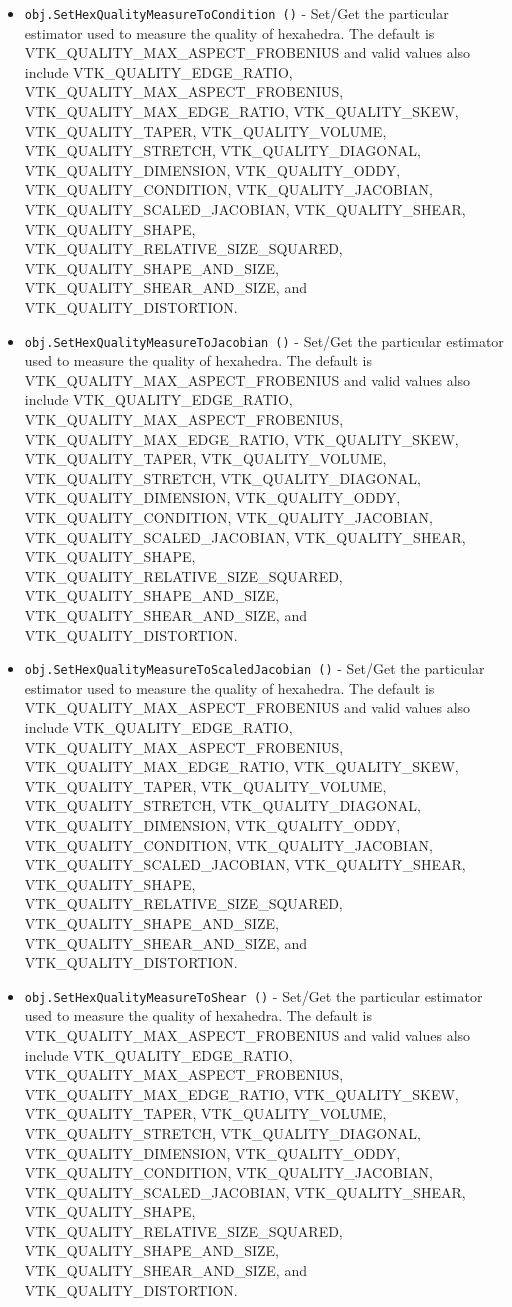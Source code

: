 \begin{itemize}
\item  \verb|obj.SetHexQualityMeasureToCondition ()| -  Set/Get the particular estimator used to measure the quality of hexahedra.
 The default is VTK\_QUALITY\_MAX\_ASPECT\_FROBENIUS and valid values also include
 VTK\_QUALITY\_EDGE\_RATIO, VTK\_QUALITY\_MAX\_ASPECT\_FROBENIUS, 
 VTK\_QUALITY\_MAX\_EDGE\_RATIO, VTK\_QUALITY\_SKEW, VTK\_QUALITY\_TAPER, VTK\_QUALITY\_VOLUME,
 VTK\_QUALITY\_STRETCH, VTK\_QUALITY\_DIAGONAL, VTK\_QUALITY\_DIMENSION,
 VTK\_QUALITY\_ODDY, VTK\_QUALITY\_CONDITION, VTK\_QUALITY\_JACOBIAN,
 VTK\_QUALITY\_SCALED\_JACOBIAN, VTK\_QUALITY\_SHEAR, VTK\_QUALITY\_SHAPE,
 VTK\_QUALITY\_RELATIVE\_SIZE\_SQUARED, VTK\_QUALITY\_SHAPE\_AND\_SIZE,
 VTK\_QUALITY\_SHEAR\_AND\_SIZE, and VTK\_QUALITY\_DISTORTION.

\item  \verb|obj.SetHexQualityMeasureToJacobian ()| -  Set/Get the particular estimator used to measure the quality of hexahedra.
 The default is VTK\_QUALITY\_MAX\_ASPECT\_FROBENIUS and valid values also include
 VTK\_QUALITY\_EDGE\_RATIO, VTK\_QUALITY\_MAX\_ASPECT\_FROBENIUS, 
 VTK\_QUALITY\_MAX\_EDGE\_RATIO, VTK\_QUALITY\_SKEW, VTK\_QUALITY\_TAPER, VTK\_QUALITY\_VOLUME,
 VTK\_QUALITY\_STRETCH, VTK\_QUALITY\_DIAGONAL, VTK\_QUALITY\_DIMENSION,
 VTK\_QUALITY\_ODDY, VTK\_QUALITY\_CONDITION, VTK\_QUALITY\_JACOBIAN,
 VTK\_QUALITY\_SCALED\_JACOBIAN, VTK\_QUALITY\_SHEAR, VTK\_QUALITY\_SHAPE,
 VTK\_QUALITY\_RELATIVE\_SIZE\_SQUARED, VTK\_QUALITY\_SHAPE\_AND\_SIZE,
 VTK\_QUALITY\_SHEAR\_AND\_SIZE, and VTK\_QUALITY\_DISTORTION.

\item  \verb|obj.SetHexQualityMeasureToScaledJacobian ()| -  Set/Get the particular estimator used to measure the quality of hexahedra.
 The default is VTK\_QUALITY\_MAX\_ASPECT\_FROBENIUS and valid values also include
 VTK\_QUALITY\_EDGE\_RATIO, VTK\_QUALITY\_MAX\_ASPECT\_FROBENIUS, 
 VTK\_QUALITY\_MAX\_EDGE\_RATIO, VTK\_QUALITY\_SKEW, VTK\_QUALITY\_TAPER, VTK\_QUALITY\_VOLUME,
 VTK\_QUALITY\_STRETCH, VTK\_QUALITY\_DIAGONAL, VTK\_QUALITY\_DIMENSION,
 VTK\_QUALITY\_ODDY, VTK\_QUALITY\_CONDITION, VTK\_QUALITY\_JACOBIAN,
 VTK\_QUALITY\_SCALED\_JACOBIAN, VTK\_QUALITY\_SHEAR, VTK\_QUALITY\_SHAPE,
 VTK\_QUALITY\_RELATIVE\_SIZE\_SQUARED, VTK\_QUALITY\_SHAPE\_AND\_SIZE,
 VTK\_QUALITY\_SHEAR\_AND\_SIZE, and VTK\_QUALITY\_DISTORTION.

\item  \verb|obj.SetHexQualityMeasureToShear ()| -  Set/Get the particular estimator used to measure the quality of hexahedra.
 The default is VTK\_QUALITY\_MAX\_ASPECT\_FROBENIUS and valid values also include
 VTK\_QUALITY\_EDGE\_RATIO, VTK\_QUALITY\_MAX\_ASPECT\_FROBENIUS, 
 VTK\_QUALITY\_MAX\_EDGE\_RATIO, VTK\_QUALITY\_SKEW, VTK\_QUALITY\_TAPER, VTK\_QUALITY\_VOLUME,
 VTK\_QUALITY\_STRETCH, VTK\_QUALITY\_DIAGONAL, VTK\_QUALITY\_DIMENSION,
 VTK\_QUALITY\_ODDY, VTK\_QUALITY\_CONDITION, VTK\_QUALITY\_JACOBIAN,
 VTK\_QUALITY\_SCALED\_JACOBIAN, VTK\_QUALITY\_SHEAR, VTK\_QUALITY\_SHAPE,
 VTK\_QUALITY\_RELATIVE\_SIZE\_SQUARED, VTK\_QUALITY\_SHAPE\_AND\_SIZE,
 VTK\_QUALITY\_SHEAR\_AND\_SIZE, and VTK\_QUALITY\_DISTORTION.


\end{itemize}

